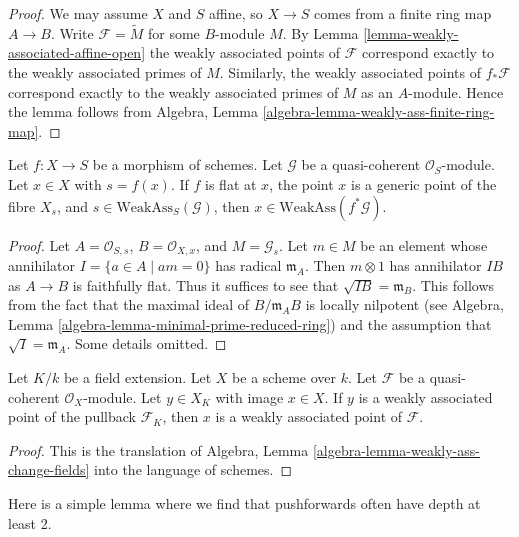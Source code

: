 \begin{proof}
We may assume $X$ and $S$ affine, so $X \to S$ comes from a finite ring map
$A \to B$. Write $\mathcal{F} = \widetilde M$ for some $B$-module $M$. By
Lemma \ref{lemma-weakly-associated-affine-open}
the weakly associated points of $\mathcal{F}$ correspond exactly to the
weakly associated primes of $M$. Similarly, the weakly associated points
of $f_*\mathcal{F}$ correspond exactly to the weakly associated primes
of $M$ as an $A$-module. Hence the lemma follows from
Algebra, Lemma \ref{algebra-lemma-weakly-ass-finite-ring-map}.
\end{proof}

\begin{lemma}
\label{lemma-weakly-ass-pullback}
Let $f : X \to S$ be a morphism of schemes. Let $\mathcal{G}$ be a
quasi-coherent $\mathcal{O}_S$-module. Let $x \in X$ with $s = f(x)$.
If $f$ is flat at $x$, the point $x$ is a generic point of the fibre $X_s$, and
$s \in \text{WeakAss}_S(\mathcal{G})$, then
$x \in \text{WeakAss}(f^*\mathcal{G})$.
\end{lemma}

\begin{proof}
Let $A = \mathcal{O}_{S, s}$, $B = \mathcal{O}_{X, x}$, and
$M = \mathcal{G}_s$. Let $m \in M$ be an element whose annihilator
$I = \{a \in A \mid am = 0\}$ has radical $\mathfrak m_A$. Then
$m \otimes 1$ has annihilator $I B$ as $A \to B$ is
faithfully flat. Thus it suffices to see that $\sqrt{I B} = \mathfrak m_B$.
This follows from the fact that the maximal ideal of $B/\mathfrak m_AB$
is locally nilpotent (see
Algebra, Lemma \ref{algebra-lemma-minimal-prime-reduced-ring})
and the assumption that $\sqrt{I} = \mathfrak m_A$.
Some details omitted.
\end{proof}

\begin{lemma}
\label{lemma-weakly-ass-change-fields}
Let $K/k$ be a field extension. Let $X$ be a scheme over $k$.
Let $\mathcal{F}$ be a quasi-coherent $\mathcal{O}_X$-module.
Let $y \in X_K$ with image $x \in X$. If $y$ is a weakly
associated point of the pullback $\mathcal{F}_K$, then $x$
is a weakly associated point of $\mathcal{F}$.
\end{lemma}

\begin{proof}
This is the translation of
Algebra, Lemma \ref{algebra-lemma-weakly-ass-change-fields}
into the language of schemes.
\end{proof}

\noindent
Here is a simple lemma where we find that pushforwards often have
depth at least 2.

